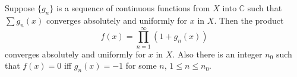 Suppose $\{g_n\}$ is a sequence of continuous functions from $X$ into $\mathbb{C}$ such that $\sum g_n(x)$ converges absolutely and uniformly for $x$ in $X$. Then the product
$$f(x) = \prod_{n=1}^{\infty} (1 + g_n(x))$$
converges absolutely and uniformly for $x$ in $X$. Also there is an integer $n_0$ such that $f(x) = 0$ iff $g_n(x) = -1$ for some $n$, $1 \leq n \leq n_0$.
